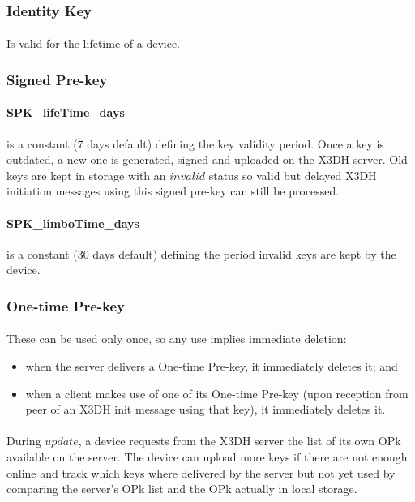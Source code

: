 \documentclass[a4paper,11pt]{article}
\begin{document}
    \subsubsection{Identity Key}
      \paragraph{}Is valid for the lifetime of a device.
    
    \subsubsection{Signed Pre-key}
      \paragraph*{SPK\_lifeTime\_days}is a constant (7 days default) defining the key validity period. Once a key is outdated, a new one is generated, signed and uploaded on the X3DH server. Old keys are kept in storage with an $invalid$ status so valid but delayed X3DH initiation messages using this signed pre-key can still be processed.
      \paragraph*{SPK\_limboTime\_days}is a constant (30 days default) defining the period invalid keys are kept by the device.
       
    \subsubsection{One-time Pre-key}
      \paragraph{}These can be used only once, so any use implies immediate deletion:
      \begin{itemize}
      \item when the server delivers a One-time Pre-key, it immediately deletes it; and
      \item when a client makes use of one of its One-time Pre-key (upon reception from peer of an X3DH init message using that key), it immediately deletes it.
      \end{itemize}
      \paragraph*{}During $update$, a device requests from the X3DH server the list of its own OPk available on the server. The device can upload more keys if there are not enough online and track which keys where delivered by the server but not yet used by comparing the server's OPk list and the OPk actually in local storage.
\end{document}
